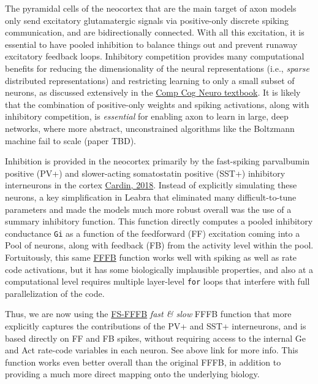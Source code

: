 \documentclass[11pt,twoside]{article}
\newif\myifpdf
\begin{document}
The pyramidal cells of the neocortex that are the main target of axon models only send excitatory glutamatergic signals via positive-only discrete spiking communication, and are bidirectionally connected. With all this excitation, it is essential to have pooled inhibition to balance things out and prevent runaway excitatory feedback loops. Inhibitory competition provides many computational benefits for reducing the dimensionality of the neural representations (i.e., \emph{sparse} distributed representations) and restricting learning to only a small subset of neurons, as discussed extensively in the \href{https://CompCogNeuro.org}{Comp Cog Neuro textbook}. It is likely that the combination of positive-only weights and spiking activations, along with inhibitory competition, is \emph{essential} for enabling axon to learn in large, deep networks, where more abstract, unconstrained algorithms like the Boltzmann machine fail to scale (paper TBD).

Inhibition is provided in the neocortex primarily by the fast-spiking parvalbumin positive (PV+) and slower-acting somatostatin positive (SST+) inhibitory interneurons in the cortex \protect\hyperlink{references}{Cardin, 2018}. Instead of explicitly simulating these neurons, a key simplification in Leabra that eliminated many difficult-to-tune parameters and made the models much more robust overall was the use of a summary inhibitory function. This function directly computes a pooled inhibitory conductance \texttt{Gi} as a function of the feedforward (FF) excitation coming into a Pool of neurons, along with feedback (FB) from the activity level within the pool. Fortuitously, this same \href{https://github.com/emer/axon/tree/master/fffb}{FFFB} function works well with spiking as well as rate code activations, but it has some biologically implausible properties, and also at a computational level requires multiple layer-level \texttt{for} loops that interfere with full parallelization of the code.

Thus, we are now using the \href{https://github.com/emer/axon/tree/master/fsfffb}{FS-FFFB} \emph{fast \& slow} FFFB function that more explicitly captures the contributions of the PV+ and SST+ interneurons, and is based directly on FF and FB spikes, without requiring access to the internal Ge and Act rate-code variables in each neuron. See above link for more info. This function works even better overall than the original FFFB, in addition to providing a much more direct mapping onto the underlying biology.
\end{document}
